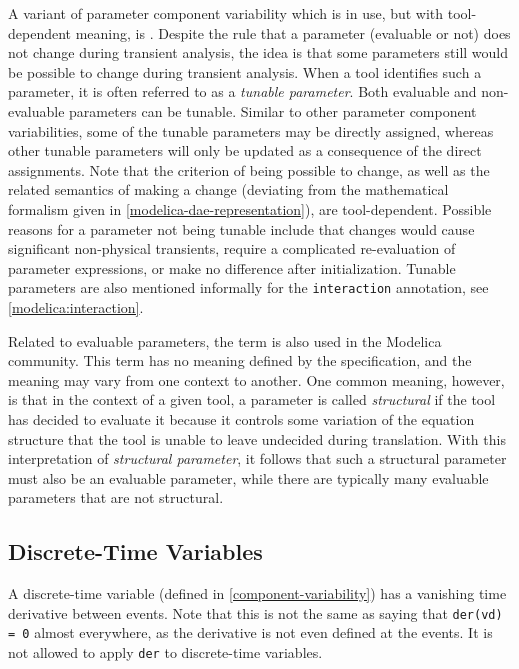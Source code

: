 \begin{nonnormative}
A variant of parameter component variability which is in use, but with tool-dependent meaning, is .
Despite the rule that a parameter (evaluable or not) does not change during transient analysis, the idea is that some parameters still would be possible to change during transient analysis.
When a tool identifies such a parameter, it is often referred to as a \emph{tunable parameter}.
Both evaluable and non-evaluable parameters can be tunable.
Similar to other parameter component variabilities, some of the tunable parameters may be directly assigned, whereas other tunable parameters will only be updated as a consequence of the direct assignments.
Note that the criterion of being possible to change, as well as the related semantics of making a change (deviating from the mathematical formalism given in \cref{modelica-dae-representation}), are tool-dependent.
Possible reasons for a parameter not being tunable include that changes would cause significant non-physical transients, require a complicated re-evaluation of parameter expressions, or make no difference after initialization.
Tunable parameters are also mentioned informally for the \lstinline!interaction! annotation, see \cref{modelica:interaction}.
\end{nonnormative}

\begin{nonnormative}
Related to evaluable parameters, the term  is also used in the Modelica community.
This term has no meaning defined by the specification, and the meaning may vary from one context to another.
One common meaning, however, is that in the context of a given tool, a parameter is called \emph{structural} if the tool has decided to evaluate it because it controls some variation of the equation structure that the tool is unable to leave undecided during translation.
With this interpretation of \emph{structural parameter}, it follows that such a structural parameter must also be an evaluable parameter, while there are typically many evaluable parameters that are not structural.
\end{nonnormative}


\subsection{Discrete-Time Variables}\label{discrete-time-variables}

A discrete-time variable (defined in \cref{component-variability}) has a vanishing time derivative between events.
Note that this is not the same as saying that \lstinline!der(vd) = 0! almost everywhere, as the derivative is not even defined at the events.
It is not allowed to apply \lstinline!der! to discrete-time variables.

